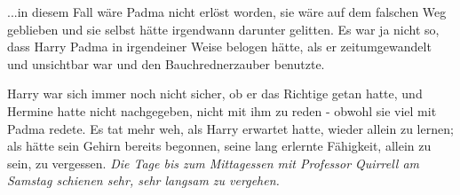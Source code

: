 ...in diesem Fall wäre Padma nicht erlöst worden, sie wäre auf dem falschen Weg
geblieben und sie selbst hätte irgendwann darunter gelitten. Es war ja nicht so,
dass Harry Padma in irgendeiner Weise belogen hätte, als er zeitumgewandelt und
unsichtbar war und den Bauchrednerzauber benutzte.

Harry war sich immer noch nicht sicher, ob er das Richtige getan hatte, und
Hermine hatte nicht nachgegeben, nicht mit ihm zu reden - obwohl sie viel mit
Padma redete. Es tat mehr weh, als Harry erwartet hatte, wieder allein zu
lernen; als hätte sein Gehirn bereits begonnen, seine lang erlernte Fähigkeit,
allein zu sein, zu vergessen. \emph{ Die Tage bis zum Mittagessen mit Professor
Quirrell am Samstag schienen sehr, sehr langsam zu vergehen.}

